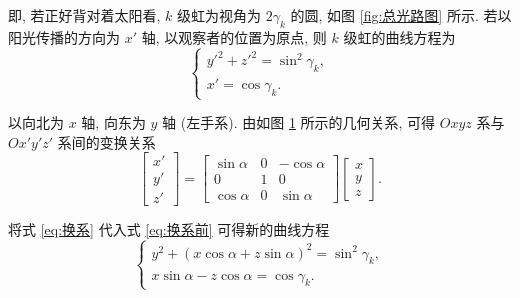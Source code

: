 \documentclass{article}
\begin{document}
即, 若正好背对着太阳看, $k$ 级虹为视角为 $2\gamma_k$ 的圆, 如图 \ref{fig:总光路图} 所示.
若以阳光传播的方向为 $x'$ 轴, 以观察者的位置为原点, 则 $k$ 级虹的曲线方程为
\begin{equation}
	\begin{cases}
		y'^2+z'^2=\sin^2\gamma_k,\\
		x'=\cos\gamma_k.
	\end{cases}
	\label{eq:换系前}
\end{equation}

以向北为 $x$ 轴, 向东为 $y$ 轴 (左手系).
由如图 \ref{fig:换系} 所示的几何关系, 可得 $Oxyz$ 系与 $Ox'y'z'$ 系间的变换关系
\begin{equation}
	\left[\begin{matrix}x'\\y'\\z'\end{matrix}\right]=
	\left[\begin{matrix}\sin\alpha & 0 & -\cos\alpha \\ 0 & 1 & 0 \\ \cos\alpha & 0 & \sin\alpha\end{matrix}\right]
	\left[\begin{matrix}x\\y\\z\end{matrix}\right].
	\label{eq:换系}
\end{equation}

\begin{figure}[h!]
	\centering
	\caption{}
	\label{fig:换系}
\end{figure}

将式 \ref{eq:换系} 代入式 \ref{eq:换系前} 可得新的曲线方程
\begin{equation}
	\begin{cases}
		y^2+\left(x\cos\alpha+z\sin\alpha\right)^2=\sin^2\gamma_k,\\
		x\sin\alpha-z\cos\alpha=\cos\gamma_k.
	\end{cases}
	\label{eq:换系后}
\end{equation}
\end{document}

